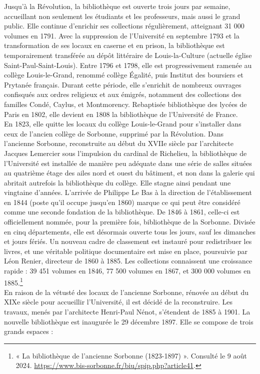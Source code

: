 \documentclass[a4paper,12pt,twoside]{book}
\begin{document}
Jusqu'à la Révolution, la bibliothèque est ouverte trois
jours par semaine, accueillant non seulement les étudiants et les
professeurs, mais aussi le grand public. Elle continue
d'enrichir ses collections régulièrement, atteignant 31
000 volumes en 1791. Avec la suppression de l'Université en septembre
1793 et la transformation de ses locaux en caserne et en prison, la
bibliothèque est temporairement transférée au dépôt littéraire de
Louis-la-Culture (actuelle église Saint-Paul-Saint-Louis). Entre 1796 et
1798, elle est progressivement ramenée au collège Louis-le-Grand,
renommé collège Égalité, puis Institut des boursiers et Prytanée
français. Durant cette période, elle s'enrichit de nombreux ouvrages
confisqués aux ordres religieux et aux émigrés, notamment des
collections des familles Condé, Caylus, et Montmorency. Rebaptisée
bibliothèque des lycées de Paris en 1802, elle devient en 1808 la
bibliothèque de l'Université de France. \\

En 1823, elle quitte les locaux du collège Louis-le-Grand pour
s'installer dans ceux de l'ancien collège de Sorbonne,
supprimé par la Révolution. Dans l'ancienne Sorbonne, reconstruite au
début du XVIIe siècle par l'architecte Jacques Lemercier
sous l'impulsion du cardinal de Richelieu, la
bibliothèque de l'Université est installée de manière peu adéquate dans
une série de salles situées au quatrième étage des ailes nord et ouest
du bâtiment, et non dans la galerie qui abritait autrefois la
bibliothèque du collège. Elle stagne ainsi pendant une vingtaine
d'années. L'arrivée de Philippe Le Bas à la direction de l'établissement
en 1844 (poste qu'il occupe jusqu'en 1860) marque ce qui peut être
considéré comme une seconde fondation de la bibliothèque. De 1846 à
1861, celle-ci est officiellement nommée, pour la première fois,
bibliothèque de la Sorbonne. Divisée en cinq départements, elle est
désormais ouverte tous les jours, sauf les dimanches et jours fériés. Un
nouveau cadre de classement est instauré pour redistribuer les livres,
et une véritable politique documentaire est mise en place, poursuivie
par Léon Renier, directeur de 1860 à 1885. Les collections connaissent
une croissance rapide : 39 451 volumes en 1846, 77 500 volumes en 1867,
et 300 000 volumes en 1885.\footnote{« La bibliothèque de l'ancienne
	Sorbonne (1823-1897) ». Consulté le 9 août 2024.
	\url{https://www.bis-sorbonne.fr/biu/spip.php?article41}.} \\

En raison de la vétusté des locaux de l'ancienne
Sorbonne, rénovée au début du XIXe siècle pour accueillir
l'Université, il est décidé de la reconstruire. Les
travaux, menés par l'architecte Henri-Paul Nénot,
s'étendent de 1885 à 1901. La nouvelle bibliothèque est
inaugurée le 29 décembre 1897. Elle se compose de trois grands espaces : \\
\end{document}
